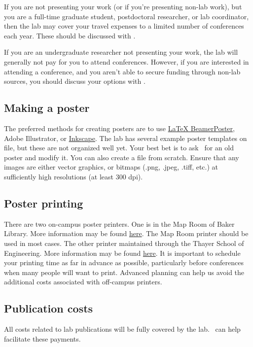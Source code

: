 \documentclass{tufte-book} %
\begin{document}
 If you are not presenting your work (or if you're presenting non-lab
 work), but you are a full-time graduate student, postdoctoral
 researcher, or lab coordinator, then the lab may cover your travel
 expenses to a limited number of conferences each year.  These should
 be discussed with \director.

If you are an undergraduate researcher not presenting your work, the lab
will generally not pay for you to attend conferences.  However, if you
are interested in attending a conference, and you aren't able to
secure funding through non-lab sources, you should discuss your
options with \director.

 \subsection{Making a poster}
 The preferred methods for creating posters are to use
 \href{https://github.com/deselaers/latex-beamerposter}{LaTeX
   BeamerPoster}, Adobe Illustrator, or
 \href{https://inkscape.org/en/}{Inkscape}.  The lab has several
 example poster templates on file, but these are not organized well
 yet.  Your best bet is to ask \director~for an old poster and modify
 it.  You can also create a file from scratch.  Ensure that any images
 are either vector graphics, or bitmaps (.png, .jpeg, .tiff, etc.) at
 sufficiently high resolutions (at least 300 dpi).

 \subsection{Poster printing}
 There are two on-campus poster printers.  One is in the Map Room of
 Baker Library.  More information may be found
 \href{http://www.dartmouth.edu/~library/maproom/printingfaq.html}{here}.
 The Map Room printer should be used in most cases.  The other printer
 maintained through the Thayer School of Engineering.  More
 information may be found
 \href{http://kb.thayer.dartmouth.edu/article/286-printing}{here}.  It
 is important to schedule your printing time as far in advance as
 possible, particularly before conferences when many people will want
 to print.  Advanced planning can help us avoid the additional costs
 associated with off-campus printers.


 \subsection{Publication costs}
All costs related to lab publications will be fully covered by the
lab.  \coordinator~can help facilitate these payments.
\end{document}
